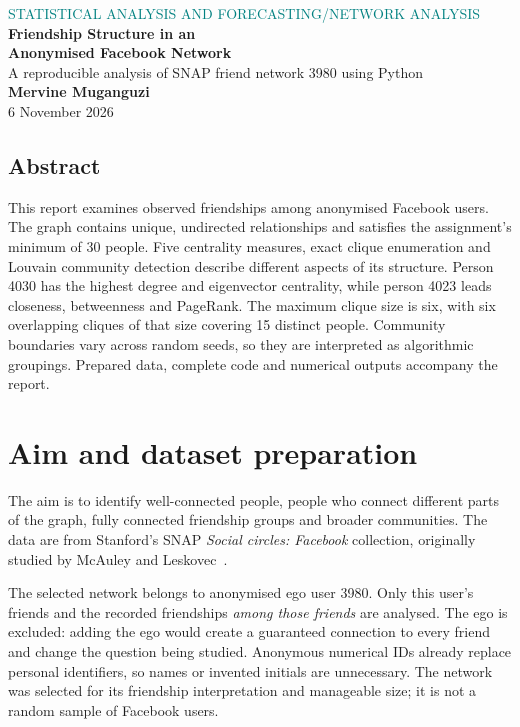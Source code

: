 \documentclass[11pt,a4paper]{article}
\begin{document}
\thispagestyle{plain}
{\small\textcolor{teal}{STATISTICAL ANALYSIS AND FORECASTING\quad /\quad NETWORK ANALYSIS}}\\[8pt]
{\LARGE\bfseries\textcolor{ink}{Friendship Structure in an\\[2pt] Anonymised Facebook Network}}\\[7pt]
{\large A reproducible analysis of SNAP friend network 3980 using Python}\\[5pt]
{\normalsize\textbf{Mervine Muganguzi}}\\[4pt]
{\small 6 November 2026}

\subsection*{Abstract}
This report examines observed friendships among \Nnodes{} anonymised Facebook users.
The graph contains \Nedges{} unique, undirected relationships and satisfies the
assignment's minimum of 30 people. Five centrality measures, exact clique
enumeration and Louvain community detection describe different aspects of its
structure. Person 4030 has the highest degree and eigenvector centrality, while
person 4023 leads closeness, betweenness and PageRank. The maximum clique size is
six, with six overlapping cliques of that size covering 15 distinct people.
Community boundaries vary across
random seeds, so they are interpreted as algorithmic groupings. Prepared data,
complete code and numerical outputs accompany the report.

\section{Aim and dataset preparation}
The aim is to identify well-connected people, people who connect different parts
of the graph, fully connected friendship groups and broader communities.
The data are from Stanford's SNAP \emph{Social circles: Facebook} collection,
originally studied by McAuley and Leskovec~\cite{snap,mcauley}.

The selected network belongs to anonymised ego user 3980. Only this user's
friends and the recorded friendships \emph{among those friends} are analysed.
The ego is excluded: adding the ego would create a guaranteed connection to
every friend and change the question being studied. Anonymous numerical IDs
already replace personal identifiers, so names or invented initials are unnecessary.
The network was selected for its friendship interpretation and manageable size;
it is not a random sample of Facebook users.
\end{document}
